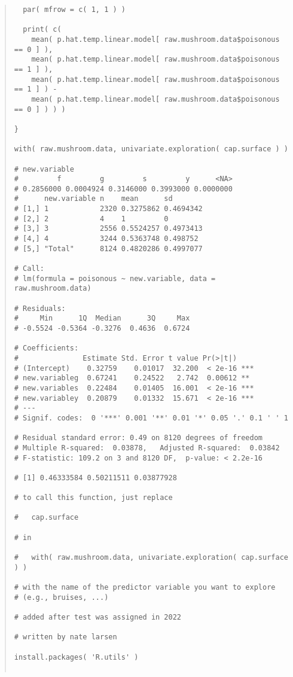 \documentclass[12pt]{article}
\begin{document}
\begin{quote}
\begin{verbatim}
  par( mfrow = c( 1, 1 ) )

  print( c( 
    mean( p.hat.temp.linear.model[ raw.mushroom.data$poisonous == 0 ] ),
    mean( p.hat.temp.linear.model[ raw.mushroom.data$poisonous == 1 ] ),
    mean( p.hat.temp.linear.model[ raw.mushroom.data$poisonous == 1 ] ) -
    mean( p.hat.temp.linear.model[ raw.mushroom.data$poisonous == 0 ] ) ) )

}

with( raw.mushroom.data, univariate.exploration( cap.surface ) )

# new.variable
#         f         g         s         y      <NA> 
# 0.2856000 0.0004924 0.3146000 0.3993000 0.0000000 
#      new.variable n    mean      sd       
# [1,] 1            2320 0.3275862 0.4694342
# [2,] 2            4    1         0        
# [3,] 3            2556 0.5524257 0.4973413
# [4,] 4            3244 0.5363748 0.498752 
# [5,] "Total"      8124 0.4820286 0.4997077

# Call:
# lm(formula = poisonous ~ new.variable, data = raw.mushroom.data)

# Residuals:
#     Min      1Q  Median      3Q     Max 
# -0.5524 -0.5364 -0.3276  0.4636  0.6724 

# Coefficients:
#               Estimate Std. Error t value Pr(>|t|)    
# (Intercept)    0.32759    0.01017  32.200  < 2e-16 ***
# new.variableg  0.67241    0.24522   2.742  0.00612 ** 
# new.variables  0.22484    0.01405  16.001  < 2e-16 ***
# new.variabley  0.20879    0.01332  15.671  < 2e-16 ***
# ---
# Signif. codes:  0 '***' 0.001 '**' 0.01 '*' 0.05 '.' 0.1 ' ' 1

# Residual standard error: 0.49 on 8120 degrees of freedom
# Multiple R-squared:  0.03878,   Adjusted R-squared:  0.03842 
# F-statistic: 109.2 on 3 and 8120 DF,  p-value: < 2.2e-16

# [1] 0.46333584 0.50211511 0.03877928

# to call this function, just replace 

#   cap.surface 

# in

#   with( raw.mushroom.data, univariate.exploration( cap.surface ) )

# with the name of the predictor variable you want to explore
# (e.g., bruises, ...)

# added after test was assigned in 2022

# written by nate larsen

install.packages( 'R.utils' )


\end{verbatim}
\end{quote}
\end{document}
